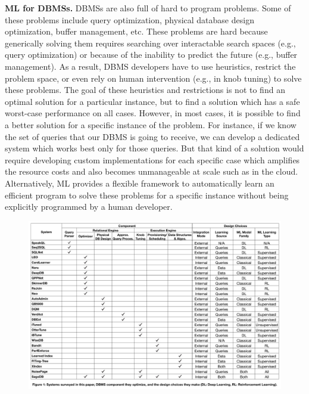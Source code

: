 \vspace{2mm}
\noindent \textbf{ML for DBMSs.} DBMSs are also full of hard to program problems.
Some of these problems include query optimization, physical database design optimization, buffer management, etc.
These problems are hard because generically solving them requires searching over interactable search spaces (e.g., query optimization) or because of the inability to predict the future (e.g., buffer management).
As a result, DBMS developers have to use heuristics, restrict the problem space, or even rely on human intervention (e.g., in knob tuning) to solve these problems.
The goal of these heuristics and restrictions is not to find an optimal solution for a particular instance, but to find a solution which has a safe worst-case performance on all cases.
However, in most cases, it is possible to find a better solution for a specific instance of the problem.
For instance, if we know the set of queries that our DBMS is going to receive, we can develop a dedicated system which works best only for those queries.
But that kind of a solution would require developing custom implementations for each specific case which amplifies the resource costs and also becomes unmanageable at scale such as in the cloud.
Alternatively, ML provides a flexible framework to automatically learn an efficient program to solve these problems for a specific instance without being explicitly programmed by a human developer.

\begin{figure}
    \centering
    \vspace{-6mm}
    \includegraphics[height=0.85\textwidth, angle=90]{images/taxonomy.pdf}
\end{figure}

